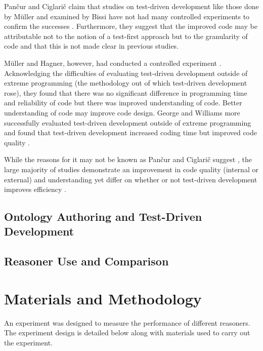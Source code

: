 \documentclass[draft]{sig-alternate-05-2015}
\newcommand{\todo}[1][]{\ifdraft{\ifthenelse{\isempty{#1}}{\hl{(TODO)}}{\hl{(TODO: #1)}}}{}}
\begin{document}
Pan\v{c}ur and Ciglari\v{c} claim that studies on test-driven development like those done by M\"{u}ller and examined by Bissi have not had many controlled experiments to confirm the successes \cite{DBLP:journals/infsof/PancurC11}. Furthermore, they suggest that the improved code may be attributable not to the notion of a test-first approach but to the granularity of code and that this is not made clear in previous studies.

 M\"{u}ller and Hagner, however, had conducted a controlled experiment \cite{DBLP:journals/iee/MullerH02}. Acknowledging the difficulties of evaluating test-driven development outside of extreme programming (the methodology out of which test-driven development rose), they found that there was no significant difference in programming time and reliability of code but there was improved understanding of code. Better understanding of code may improve code design. George and Williams more successfully evaluated test-driven development outside of extreme programming and found that test-driven development increased coding time but improved code quality \cite{DBLP:journals/infsof/GeorgeW04}.
 
 While the reasons for it may not be known as Pan\v{c}ur and Ciglari\v{c} suggest \cite{DBLP:journals/infsof/PancurC11}, the large majority of studies demonstrate an improvement in code quality (internal or external) \cite{DBLP:journals/infsof/BissiNE16} and understanding yet differ on whether or not test-driven development improves efficiency \cite{DBLP:journals/infsof/GeorgeW04,DBLP:journals/iee/MullerH02}.

\subsection{Ontology Authoring and Test-Driven Development}

\todo

\subsection{Reasoner Use and Comparison}

\todo

\section{Materials and Methodology}

An experiment was designed to measure the performance of different reasoners. The experiment design is detailed below along with materials used to carry out the experiment.
\end{document}
